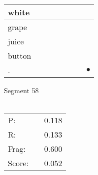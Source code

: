 \documentclass[landscape]{article}
\newcommand{\ssp}{\hspace{2pt}}
\newcommand{\mex}{\cellcolor{g}$\bullet$}
\begin{document}
\begin{tabular}{|l|p{10pt}|p{10pt}|p{10pt}|p{10pt}|p{10pt}|p{10pt}|p{10pt}|}
\hline
\ssp white \ssp&\hspace{2pt}&\hspace{2pt}&\hspace{2pt}&\hspace{2pt}&\hspace{2pt}&\hspace{2pt}&\hspace{2pt}\\
\hline
\ssp grape \ssp&\hspace{2pt}&\hspace{2pt}&\hspace{2pt}&\hspace{2pt}&\hspace{2pt}&\hspace{2pt}&\hspace{2pt}\\
\hline
\ssp juice \ssp&\hspace{2pt}&\hspace{2pt}&\hspace{2pt}&\hspace{2pt}&\hspace{2pt}&\hspace{2pt}&\hspace{2pt}\\
\hline
\ssp button \ssp&\hspace{2pt}&\hspace{2pt}&\hspace{2pt}&\hspace{2pt}&\hspace{2pt}&\hspace{2pt}&\hspace{2pt}\\
\hline
\ssp \cellcolor{ref6}. \ssp&\hspace{2pt}&\hspace{2pt}&\hspace{2pt}&\hspace{2pt}&\hspace{2pt}&\hspace{2pt}&\hspace{2pt}\mex\\
\hline
\end{tabular}

\vspace{6pt}
\noindent Segment 58\\\\
\noindent\begin{tabular}{lm{12pt}r}
\hline
P:&&0.118\\
R:&&0.133\\
Frag:&&0.600\\
Score:&&0.052\\
\end{tabular}
\end{document}

